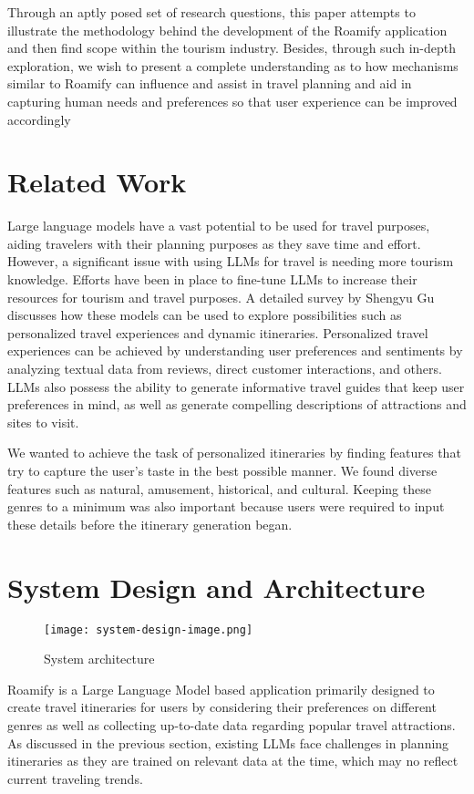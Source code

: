 \documentclass[sigconf,authordraft]{acmart}
\begin{document}
    Through an aptly posed set of research questions, this paper attempts to illustrate the
    methodology behind the development of the Roamify application and then find scope within the
    tourism industry. Besides, through such in-depth exploration, we wish to present a complete
    understanding as to how mechanisms similar to Roamify can influence and assist in travel
    planning and aid in capturing human needs and preferences so that user experience can be
    improved accordingly

\section{Related Work}
  Large language models have a vast potential to be used for travel purposes, aiding travelers with their planning purposes as they save time and effort. However, a significant issue with using LLMs for travel is needing more tourism knowledge. Efforts have been in place to fine-tune LLMs to increase their resources for tourism and travel purposes\cite{ref3}. A detailed survey by Shengyu Gu discusses how these models can be used to explore possibilities such as personalized travel experiences and dynamic itineraries\cite{ref4}. Personalized travel experiences can be achieved by understanding user preferences and sentiments by analyzing textual data from reviews, direct customer interactions, and others. LLMs also possess the ability to generate informative travel guides that keep user preferences in mind, as well as generate compelling descriptions of attractions and sites to visit.

  We wanted to achieve the task of personalized itineraries by finding features that try to capture the user's taste in the best possible manner. We found diverse features such as natural, amusement, historical, and cultural. Keeping these genres to a minimum was also important because users were required to input these details before the itinerary generation began.

\newpage
\section{System Design and Architecture}

\begin{figure}
    \centering
    \texttt{[image: system-design-image.png]}
    \caption{System architecture}
    \label{fig:system-design}
\end{figure}
  Roamify is a Large Language Model based application primarily designed to create travel itineraries for users by considering their preferences on different genres as well as collecting up-to-date data regarding popular travel attractions. As discussed in the previous section, existing LLMs face challenges in planning itineraries as they are trained on relevant data at the time, which may no reflect current traveling trends.
\end{document}
